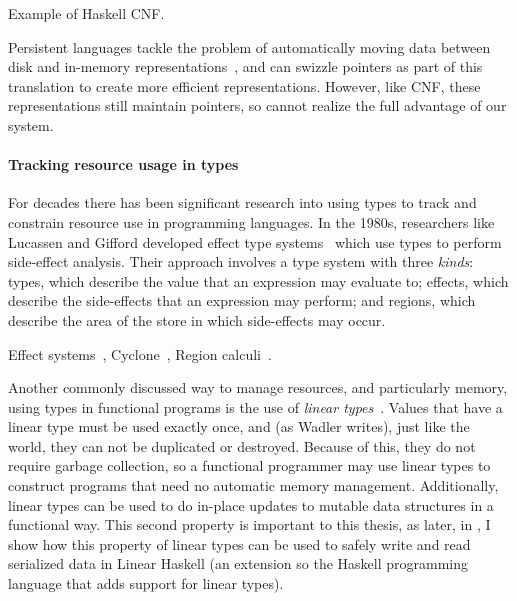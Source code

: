 Example of Haskell CNF.


{Persistent languages tackle the problem of automatically moving data between disk
and in-memory representations~\cite{persistent-java,persistent-object-systems,persistent-objects-thor}, and can swizzle pointers as part of this
translation to create more efficient representations. However, like CNF, these
representations still maintain pointers, so cannot realize the full advantage of
our system.}

\paragraph{Tracking resource usage in types}


For decades there has been significant research into using types to track and
constrain resource use in programming languages. In the 1980s, researchers like
Lucassen and Gifford developed effect type systems~\cite{effect-types} which use
types to perform side-effect analysis. Their approach involves a type system
with three \emph{kinds}: types, which describe the value that an expression may
evaluate to; effects, which describe the side-effects that an expression may
perform; and regions, which describe the area of the store in which side-effects
may occur.

Effect systems~\cite{effect-types}, Cyclone~\cite{cyclone-pldi}, Region
calculi~\cite{mlkit-retrospective}.

Another commonly discussed way to manage resources, and particularly memory,
using types in functional programs is the use of \emph{linear
types}~\cite{wadler-linear-types}. Values that have a linear type must be used
exactly once, and (as Wadler writes), just like the world, they can not be
duplicated or destroyed. Because of this, they do not require garbage
collection, so a functional programmer may use linear types to construct
programs that need no automatic memory management. Additionally, linear types
can be used to do in-place updates to mutable data structures in a functional
way. This second property is important to this thesis, as later, in
, I show how this property of linear types can be used to
safely write and read serialized data in Linear Haskell (an extension so the Haskell
programming language that adds support for linear types).


